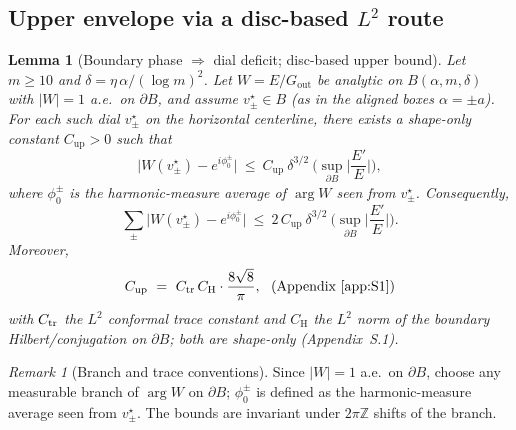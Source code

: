 \documentclass[11pt]{article}
\numberwithin{equation}{section}
\newtheorem{lemma}[theorem]{Lemma}
\theoremstyle{remark}
\newtheorem{remark}[theorem]{Remark}
\newcommand{\Gout}{G_{\mathrm{out}}}
\begin{document}
\subsection{Upper envelope via a disc-based $L^2$ route}\label{subsec:upper}

\begin{lemma}[Boundary phase $\Rightarrow$ dial deficit; disc-based upper bound]\label{lem:upper-disc}
Let $m\ge 10$ and $\delta=\eta\,\alpha/(\log m)^2$. Let $W=E/\Gout$ be analytic on $B(\alpha,m,\delta)$ with $|W|=1$ a.e.\ on $\partial B$, and assume $v_\pm^\star\in B$ (as in the aligned boxes $\alpha=\pm a$). %
For each such dial $v_\pm^\star$ on the horizontal centerline, there exists a shape-only constant $C_{\mathrm{up}}>0$ such that
\begin{equation}\label{eq:upper-disc-point}
\big|W(v_\pm^\star)-e^{i\phi_0^\pm}\big|
\ \le\ C_{\mathrm{up}}\ \delta^{3/2}\ \Big(\sup_{\partial B}\Big|\frac{E'}{E}\Big|\Big),
\end{equation}
where $\phi_0^\pm$ is the harmonic-measure average of $\arg W$ seen from $v_\pm^\star$. Consequently,
\begin{equation}\label{eq:Uhm-upper-disc}
\sum_{\pm}\big|W(v_\pm^\star)-e^{i\phi_0^\pm}\big|
\ \le\ 2\,C_{\mathrm{up}}\ \delta^{3/2}\ \Big(\sup_{\partial B}\Big|\frac{E'}{E}\Big|\Big).
\end{equation}
Moreover,
\begin{equation}\label{eq:Cup-def}
C_{\mathrm{up}}\ =\ C_{\rm tr}\,C_{\mathrm H}\cdot \frac{8\sqrt{8}}{\pi},\ \ \text{(Appendix~\ref{app:S1})} %
\end{equation}
with $C_{\rm tr}$ the $L^2$ conformal trace constant and $C_{\mathrm H}$ the $L^2$ norm of the boundary Hilbert/conjugation on $\partial B$; both are \emph{shape-only} (Appendix~S.1).
\end{lemma}

\begin{remark}[Branch and trace conventions]
Since $|W|=1$ a.e.\ on $\partial B$, choose any measurable branch of $\arg W$ on $\partial B$; $\phi_0^\pm$ is defined as the harmonic-measure average seen from $v_\pm^\star$. The bounds are invariant under $2\pi\mathbb Z$ shifts of the branch.
\end{remark}
\end{document}
